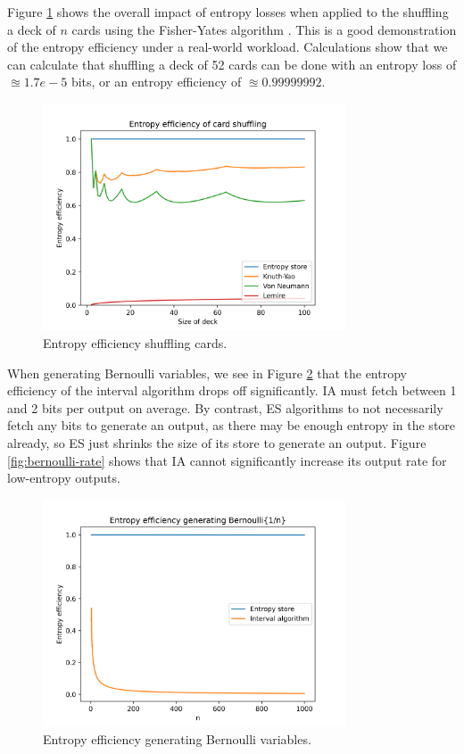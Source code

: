 \documentclass[12pt]{article}
\begin{document}
Figure \ref{fig:shuffling-efficiency} shows the overall impact of entropy losses when applied to the shuffling a deck of $n$ cards using the Fisher-Yates algorithm \cite{fisher1953statistical, durstenfeld1964algorithm, knuth2014art}. This is a good demonstration of the entropy efficiency under a real-world workload. Calculations show that we can calculate that shuffling a deck of 52 cards can be done with an entropy loss of $\approxeq 1.7e-5$ bits, or an entropy efficiency of $\approxeq 0.99999992$.

\begin{figure}[ht]
\centering
\includegraphics[width=0.8\textwidth]{shuffling_efficiency.png}
\caption{Entropy efficiency shuffling cards.}
\label{fig:shuffling-efficiency}
\end{figure}

When generating Bernoulli variables, we see in Figure \ref{fig:bernoulli-efficiency} that the entropy efficiency of the interval algorithm drops off significantly. IA must fetch between 1 and 2 bits per output on average. By contrast, ES algorithms to not necessarily fetch any bits to generate an output, as there may be enough entropy in the store already, so ES just shrinks the size of its store to generate an output. Figure \ref{fig:bernoulli-rate} shows that IA cannot significantly increase its output rate for low-entropy outputs.

\begin{figure}[ht]
\centering
\includegraphics[width=0.8\textwidth]{bernoulli_efficiency.png}
\caption{Entropy efficiency generating Bernoulli variables.}
\label{fig:bernoulli-efficiency}
\end{figure}
\end{document}
